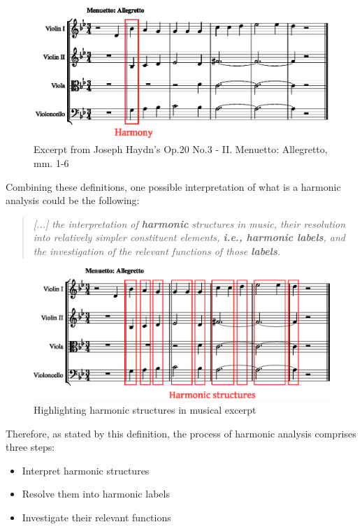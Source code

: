 \begin{figure}[h]
  \caption{Excerpt from Joseph Haydn's Op.20 No.3 - II. Menuetto: Allegretto, mm. 1-6}
  \label{fig:harmony}
  \centering
    \includegraphics[width=1.0\textwidth]{01-introduction/figures/1}
\end{figure}

Combining these definitions, one possible interpretation of what is a harmonic analysis could be the following:

\begin{quote}
\centering
\emph{[...] the interpretation of \textbf{harmonic} structures in music,
their resolution into relatively simpler constituent elements, \textbf{i.e., harmonic labels}, and the investigation of the relevant functions of those \textbf{labels}.}
\end{quote}

\begin{figure}[h]
  \caption{Highlighting harmonic structures in musical excerpt}
  \label{fig:harmonic-structures}
  \centering
    \includegraphics[width=1.0\textwidth]{01-introduction/figures/2}
\end{figure}

Therefore, as stated by this definition, the process of harmonic analysis comprises three steps:

\begin{itemize}
  \item Interpret harmonic structures
  \item Resolve them into harmonic labels
  \item Investigate their relevant functions
\end{itemize}

